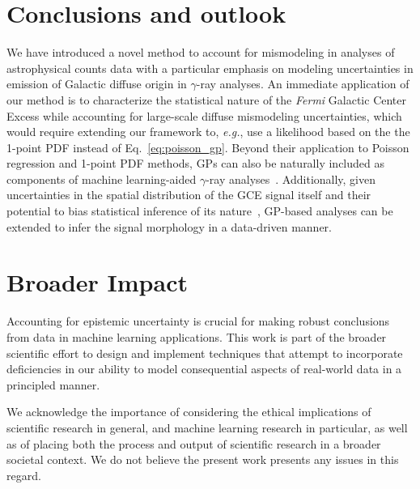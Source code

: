 \documentclass[]{article}
\begin{document}
\section{Conclusions and outlook}
\label{sec:conclusions}

We have introduced a novel method to account for mismodeling in analyses of astrophysical counts data with a particular emphasis on modeling uncertainties in emission of Galactic diffuse origin in $\gamma$-ray analyses. An immediate application of our method is to characterize the statistical nature of the \emph{Fermi} Galactic Center Excess while accounting for large-scale diffuse mismodeling uncertainties, which would require extending our framework to, \emph{e.g.}, use a likelihood based on the the 1-point PDF instead of Eq.~\eqref{eq:poisson_gp}. Beyond their application to Poisson regression and 1-point PDF methods, GPs can also be naturally included as components of machine learning-aided $\gamma$-ray analyses~\cite{List:2020mzd,Caron:2017udl}. Additionally, given uncertainties in the spatial distribution of the GCE signal itself and their potential to bias statistical inference of its nature~\cite{Leane:2020nmi,Leane:2020pfc}, GP-based analyses can be extended to infer the signal morphology in a data-driven manner. 

\section*{Broader Impact}
\label{sec:impact}

Accounting for epistemic uncertainty is crucial for making robust conclusions from data in machine learning applications. This work is part of the broader scientific effort to design and implement techniques that attempt to incorporate deficiencies in our ability to model consequential aspects of real-world data in a principled manner.

We acknowledge the importance of considering the ethical implications of scientific research in general, and machine learning research in particular, as well as of placing both the process and output of scientific research in a broader societal context. We do not believe the present work presents any issues in this regard. 
\end{document}
